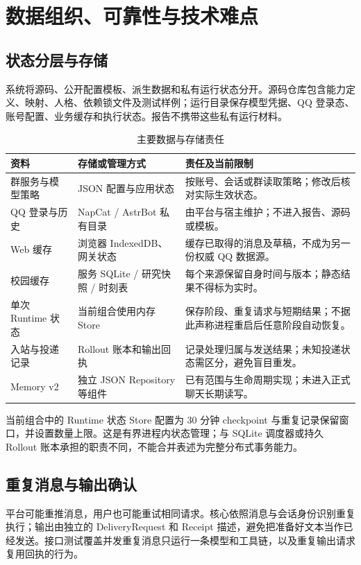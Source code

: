 \section{数据组织、可靠性与技术难点}
\subsection{状态分层与存储}
系统将源码、公开配置模板、派生数据和私有运行状态分开。源码仓库包含能力定义、映射、人格、依赖锁文件及测试样例；运行目录保存模型凭据、QQ 登录态、账号配置、业务缓存和执行状态。报告不携带这些私有运行材料。

\begin{table}[htbp]\centering
\caption{主要数据与存储责任}
\begin{tabularx}{\textwidth}{@{}L{31mm}L{32mm}Y@{}}\toprule
资料 & 存储或管理方式 & 责任及当前限制\\\midrule
群服务与模型策略 & JSON 配置与应用状态 & 按账号、会话或群读取策略；修改后核对实际生效状态。\\
QQ 登录与历史 & NapCat / AstrBot 私有目录 & 由平台与宿主维护；不进入报告、源码或模板。\\
Web 缓存 & 浏览器 IndexedDB、网关状态 & 缓存已取得的消息及草稿，不成为另一份权威 QQ 数据源。\\
校园缓存 & 服务 SQLite / 研究快照 / 时刻表 & 每个来源保留自身时间与版本；静态结果不得标为实时。\\
单次 Runtime 状态 & 当前组合使用内存 Store & 保存阶段、重复请求与短期结果；不据此声称进程重启后任意阶段自动恢复。\\
入站与投递记录 & Rollout 账本和输出回执 & 记录处理归属与发送结果；未知投递状态需区分，避免盲目重发。\\
Memory v2 & 独立 JSON Repository 等组件 & 已有范围与生命周期实现；未进入正式聊天长期读写。\\\bottomrule
\end{tabularx}
\end{table}

当前组合中的 Runtime 状态 Store 配置为 30 分钟 checkpoint 与重复记录保留窗口，并设置数量上限。这是有界进程内状态管理；与 SQLite 调度器或持久 Rollout 账本承担的职责不同，不能合并表述为完整分布式事务能力。

\subsection{重复消息与输出确认}
平台可能重推消息，用户也可能重试相同请求。核心依照消息与会话身份识别重复执行；输出由独立的 DeliveryRequest 和 Receipt 描述，避免把准备好文本当作已经发送。接口测试覆盖并发重复消息只运行一条模型和工具链，以及重复输出请求复用回执的行为。

